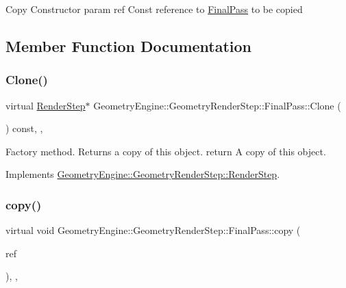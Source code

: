 Copy Constructor param ref Const reference to \mbox{\hyperlink{class_geometry_engine_1_1_geometry_render_step_1_1_final_pass}{Final\+Pass}} to be copied 

\subsection{Member Function Documentation}
\mbox{\label{class_geometry_engine_1_1_geometry_render_step_1_1_final_pass_a6633ed9c32944cc390d2b0ab32225845}} 
\subsubsection{\texorpdfstring{Clone()}{Clone()}}
{\footnotesize\ttfamily virtual \mbox{\hyperlink{class_geometry_engine_1_1_geometry_render_step_1_1_render_step}{Render\+Step}}$\ast$ Geometry\+Engine\+::\+Geometry\+Render\+Step\+::\+Final\+Pass\+::\+Clone (\begin{DoxyParamCaption}{ }\end{DoxyParamCaption}) const\hspace{0.3cm}{\ttfamily [inline]}, {\ttfamily [override]}, {\ttfamily [virtual]}}

Factory method. Returns a copy of this object. return A copy of this object. 

Implements \mbox{\hyperlink{class_geometry_engine_1_1_geometry_render_step_1_1_render_step_afe33ea9d82c5be11f55af7d39691d44b}{Geometry\+Engine\+::\+Geometry\+Render\+Step\+::\+Render\+Step}}.

\mbox{\label{class_geometry_engine_1_1_geometry_render_step_1_1_final_pass_a4ae9bc7bbc603ec3fd5c7681cc20e8f0}} 
\subsubsection{\texorpdfstring{copy()}{copy()}}
{\footnotesize\ttfamily virtual void Geometry\+Engine\+::\+Geometry\+Render\+Step\+::\+Final\+Pass\+::copy (\begin{DoxyParamCaption}\item[{const \mbox{\hyperlink{class_geometry_engine_1_1_geometry_render_step_1_1_final_pass}{Final\+Pass}} \&}]{ref }\end{DoxyParamCaption})\hspace{0.3cm}{\ttfamily [inline]}, {\ttfamily [protected]}, {\ttfamily [virtual]}}

